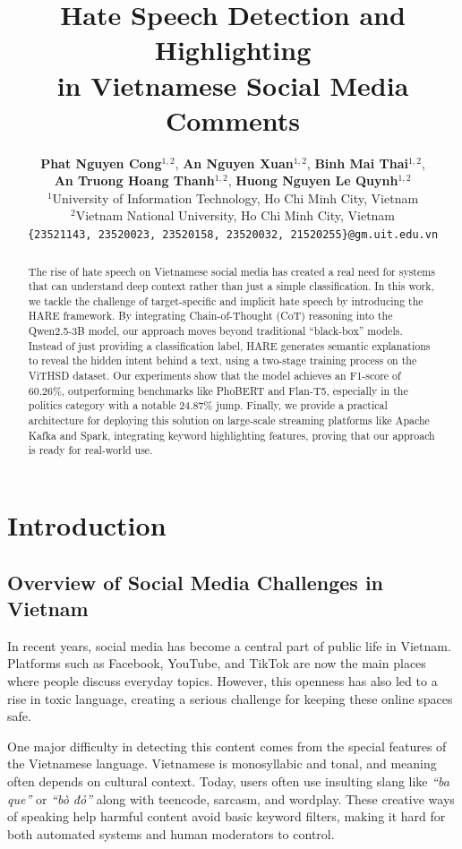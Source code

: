 \documentclass[11pt]{article}
\title{Hate Speech Detection and Highlighting\\in Vietnamese Social Media Comments}
\author{
  \textbf{Phat Nguyen Cong}$^{1,2}$, \textbf{An Nguyen Xuan}$^{1,2}$, \textbf{Binh Mai Thai}$^{1,2}$, \\ %
  \textbf{An Truong Hoang Thanh}$^{1,2}$, \textbf{Huong Nguyen Le Quynh}$^{1,2}$ \\
  \addlinespace[0.2cm] %
  $^1$University of Information Technology, Ho Chi Minh City, Vietnam \\
  $^2$Vietnam National University, Ho Chi Minh City, Vietnam \\
  \texttt{\{23521143, 23520023, 23520158, 23520032, 21520255\}@gm.uit.edu.vn}
}
\begin{document}
\maketitle

\begin{abstract}
The rise of hate speech on Vietnamese social media has created a real need for systems that
can understand deep context rather than just a simple classification. In this work, we tackle
the challenge of target-specific and implicit hate speech by introducing the HARE framework.
By integrating Chain-of-Thought (CoT) reasoning into the Qwen2.5-3B model, our approach
moves beyond traditional ``black-box'' models. Instead of just providing a classification label, HARE generates semantic explanations to reveal
the hidden intent behind a text, using a two-stage training process on the ViTHSD dataset.
Our experiments show that the model achieves an F1-score of 60.26\%, outperforming
benchmarks like PhoBERT and Flan-T5, especially in the politics category with a notable
24.87\% jump. Finally, we provide a practical architecture for deploying this solution on
large-scale streaming platforms like Apache Kafka and Spark, integrating keyword highlighting
features, proving that our approach is ready for real-world use.
\end{abstract}

\section{Introduction}

\subsection{Overview of Social Media Challenges in Vietnam}
In recent years, social media has become a central part of public life in Vietnam. Platforms
such as Facebook, YouTube, and TikTok are now the main places where people discuss
everyday topics. However, this openness has also led to a rise in toxic language, creating a
serious challenge for keeping these online spaces safe.

One major difficulty in detecting this content comes from the special features of the
Vietnamese language. Vietnamese is monosyllabic and tonal, and meaning often depends on
cultural context. Today, users often use insulting slang like \foreignlanguage{vietnamese}{\textit{``ba que''}} or \foreignlanguage{vietnamese}{\textit{``bò đỏ''}} along with
teencode, sarcasm, and wordplay. These creative ways of speaking help harmful content
avoid basic keyword filters, making it hard for both automated systems and human
moderators to control.
\end{document}

